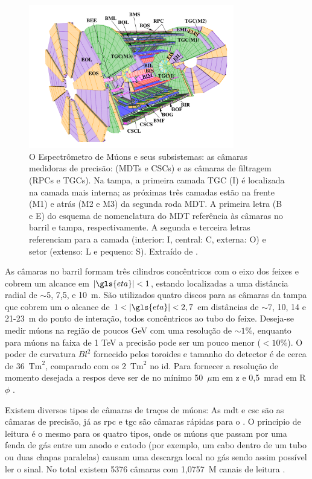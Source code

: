 \begin{figure}[h!t]
\centering
\includegraphics[width=0.8\textwidth]{imagens/Muon_system_Initial.pdf}
\caption[O Espectrômetro de Múons]{
O Espectrômetro de Múons e seus subsistemas: as câmaras medidoras de
precisão: (MDTs e CSCs) e as câmaras de filtragem (RPCs e TGCs). Na tampa, a
primeira camada TGC (I) é localizada na camada mais interna; as próximas três
camadas estão na frente (M1) e atrás (M2 e M3) da segunda roda MDT. A primeira
letra (B e E) do esquema de nomenclatura do MDT referência às câmaras no barril
e tampa, respectivamente. A segunda e terceira letras referenciam para a camada
(interior: I, central: C, externa: O) e setor (extenso: L e pequeno: S). Extraído de
\cite{paper_atlas}.}
\label{fig:espec_muons}
\end{figure}

As câmaras no barril formam três cilindros
concêntricos com o eixo dos feixes e cobrem um alcance em $|\gls{eta}| < 1$,
estando localizadas a uma distância radial de $\sim$5, 7,5, e 10~m. São
utilizados quatro discos para as câmaras da tampa que cobrem um o alcance de 
$1 < |\gls{eta}| < 2,7$ em distâncias de $\sim$7, 10, 14 e 21-23~m do ponto de
interação, todos concêntricos ao tubo do feixe. Deseja-se medir múons
na região de poucos GeV com uma resolução de $\sim1\%$, enquanto para múons na
faixa de 1 TeV a precisão pode ser um pouco menor ($ < 10\%$). O poder de
curvatura $Bl^2$ fornecido pelos toroides e tamanho do detector é de cerca de 36~$\text{Tm}^2$, 
comparado com os 2~$\text{Tm}^2$ no \gls{id}. Para fornecer a
resolução de momento desejada a \gls{respos} deve ser de no mínimo
50~$\mu$m em z e 0,5~mrad em R$\phi$ \cite{ATLAS_TDR}.

Existem diversos tipos de câmaras de traços de múons: As \gls{mdt} e \gls{csc}
são as câmaras de precisão, já as \gls{rpc} e \gls{tgc} são câmaras
rápidas para o . O principio de leitura é o mesmo para os quatro
tipos, onde os múons que passam por uma fenda de gás entre um anodo e catodo (por
exemplo, um cabo dentro de um tubo ou duas chapas paralelas) causam uma descarga
local no gás sendo assim possível ler o sinal. No total existem 5376 câmaras
com 1,0757~M canais de leitura \cite{tese_jatos}.

